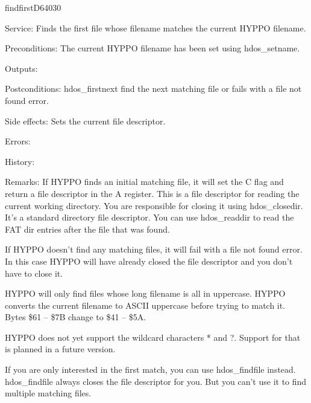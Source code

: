 %
\newpage
\begin{hyppotrap}{findfirst}{D640}{30}
\item [Service:]
  Finds the first file whose filename matches the current HYPPO filename.
\item [Preconditions:]
  The current HYPPO filename has been set using hdos\_setname.
\item [Outputs:]
\item [Postconditions:]
  hdos\_firstnext find the next matching file or fails with a file not found
  error.
\item [Side effects:]
  Sets the current file descriptor.
\item [Errors:]
\item [History:]
\item [Remarks:]
  If HYPPO finds an initial matching file, it will set the C flag and
  return a file descriptor in the A register. This is a file descriptor for
  reading the current working directory. You are responsible for closing it
  using hdos\_closedir. It's a standard directory file descriptor. You can use
  hdos\_readdir to read the FAT dir entries after the file that was found.

  If HYPPO doesn't find any matching files, it will fail with a file
  not found error. In this case HYPPO will have already closed the
  file descriptor and you don't have to close it.

  HYPPO will only find files whose long filename is all in uppercase.
  HYPPO converts the current filename to ASCII uppercase before trying
  to match it. Bytes \$61 -- \$7B change to \$41 -- \$5A.

  HYPPO does not yet support the wildcard characters * and ?. Support
  for that is planned in a future version.

  If you are only interested in the first match, you can use hdos\_findfile
  instead. hdos\_findfile always closes the file descriptor for you. But you
  can't use it to find multiple matching files.
\end{hyppotrap}


